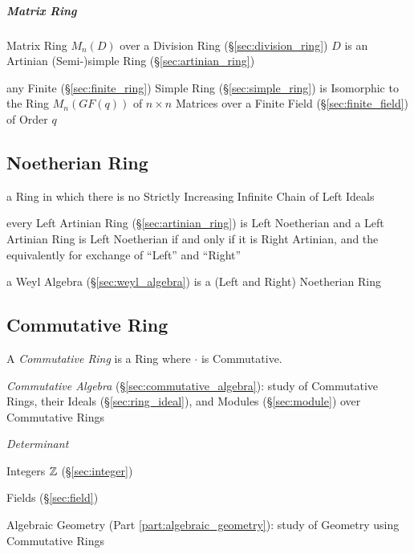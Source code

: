 \subparagraph{Matrix Ring}\label{sec:matrix_ring}\hfill

Matrix Ring $M_n(D)$ over a Division Ring (\S\ref{sec:division_ring}) $D$ is an
Artinian (Semi-)simple Ring (\S\ref{sec:artinian_ring})

any Finite (\S\ref{sec:finite_ring}) Simple Ring (\S\ref{sec:simple_ring}) is
Isomorphic to the Ring $M_n(GF(q))$ of $n \times n$ Matrices over a Finite Field
(\S\ref{sec:finite_field}) of Order $q$



\subsection{Noetherian Ring}\label{sec:noetherian_ring}

a Ring in which there is no Strictly Increasing Infinite Chain of Left Ideals

every Left Artinian Ring (\S\ref{sec:artinian_ring}) is Left Noetherian and a
Left Artinian Ring is Left Noetherian if and only if it is Right Artinian, and
the equivalently for exchange of ``Left'' and ``Right''

\fist a Weyl Algebra (\S\ref{sec:weyl_algebra}) is a (Left and Right)
Noetherian Ring



\subsection{Commutative Ring}\label{sec:commutative_ring}

A \emph{Commutative Ring} is a Ring where $\cdot$ is Commutative.

\fist \emph{Commutative Algebra} (\S\ref{sec:commutative_algebra}): study of
Commutative Rings, their Ideals (\S\ref{sec:ring_ideal}), and Modules
(\S\ref{sec:module}) over Commutative Rings

\emph{Determinant}

Integers $\mathbb{Z}$ (\S\ref{sec:integer})

Fields (\S\ref{sec:field})

Algebraic Geometry (Part \ref{part:algebraic_geometry}): study of
Geometry using Commutative Rings

